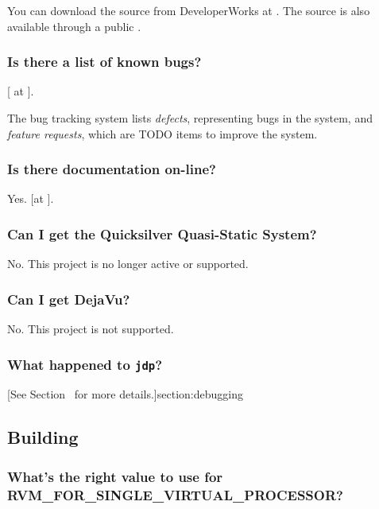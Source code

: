 You can download the \jrvm{} source from DeveloperWorks at \xlink{{\tt
\RVMDownloadURL}}{\RVMDownloadURL}.  The \jrvm{} source is also available
through a public .

\subsubsection{Is there a list of known bugs?}

[ at 
{\tt \RVMBugURL}]{\RVMBugURL}.

The bug tracking system lists {\em defects}, representing bugs in the system, and
{\em feature requests}, which are TODO items to improve the system.

\subsubsection{Is there documentation on-line?}

Yes.  [at
{\tt \RVMHomeURL}]{\RVMHomeURL}.

\subsubsection{Can I get the Quicksilver Quasi-Static System?}

No. This project is no longer active or supported.

\subsubsection{Can I get DejaVu?}

No. This project is not supported. 

\subsubsection{What happened to {\tt jdp}?}

[See
Section~\Ref{} for more details.]{section:debugging}

\subsection{Building \jrvm}


\subsubsection{What's the right value to use for
RVM\_\-FOR\_\-SIN\-GLE\_\-VIR\-TU\-AL\_\-PRO\-CES\-SOR?} 
\label{singleProcessorQuestion}

